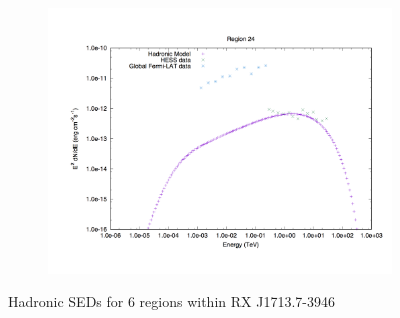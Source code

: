 \documentclass[12pt,a4paper]{article}
\begin{document}
\begin{figure}[H]
\begin{subfigure}{0.5\textwidth}
		\centering
		\includegraphics[width=0.7\linewidth, height=0.27\textheight, angle=-90]{rxj1713_had24}
		\label{fig:rxj1713lephad24}
	\end{subfigure}
	\caption{Hadronic SEDs for 6 regions within RX J1713.7-3946}
	\label{fig:regionalhadseds}
\end{figure}
\end{document}
